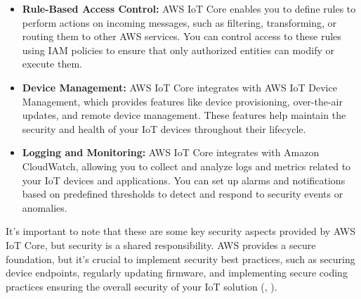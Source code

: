 \begin{itemize}
	\item \textbf{Rule-Based Access Control:} AWS IoT Core enables you to define rules to perform actions on incoming messages, such as filtering, transforming, or routing them to other AWS services. You can control access to these rules using IAM policies to ensure that only authorized entities can modify or execute them.
	
	\item \textbf{Device Management:} AWS IoT Core integrates with AWS IoT Device Management, which provides features like device provisioning, over-the-air updates, and remote device management. These features help maintain the security and health of your IoT devices throughout their lifecycle.
	
	\item \textbf{Logging and Monitoring:} AWS IoT Core integrates with Amazon CloudWatch, allowing you to collect and analyze logs and metrics related to your IoT devices and applications. You can set up alarms and notifications based on predefined thresholds to detect and respond to security events or anomalies.
\end{itemize}

It's important to note that these are some key security aspects provided by AWS IoT Core, but security is a shared responsibility. 
AWS provides a secure foundation, but it's crucial to implement security best practices, such as securing device endpoints, regularly updating firmware, and implementing secure coding practices ensuring the overall security of your IoT solution (\cite{RefAwsIotCoreSecurity}, \cite{RefAwsIotCoreSecurityBestPractices}).